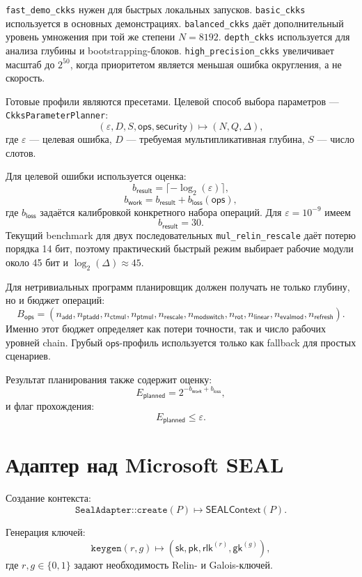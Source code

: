 \documentclass[12pt]{article}
\begin{document}
\texttt{fast\_demo\_ckks} нужен для быстрых локальных запусков.
\texttt{basic\_ckks} используется в основных демонстрациях.
\texttt{balanced\_ckks} даёт дополнительный уровень умножения при
той же степени \(N=8192\). \texttt{depth\_ckks} используется для
анализа глубины и bootstrapping-блоков. \texttt{high\_precision\_ckks}
увеличивает масштаб до \(2^{50}\), когда приоритетом является меньшая
ошибка округления, а не скорость.

Готовые профили являются пресетами. Целевой способ выбора параметров ---
\texttt{CkksParameterPlanner}:
\[
    (\varepsilon, D, S, \mathsf{ops}, \mathsf{security})
    \mapsto
    (N, Q, \Delta),
\]
где \(\varepsilon\) --- целевая ошибка, \(D\) --- требуемая
мультипликативная глубина, \(S\) --- число слотов.

Для целевой ошибки используется оценка:
\[
    b_{\mathsf{result}} = \lceil -\log_2(\varepsilon) \rceil,
\]
\[
    b_{\mathsf{work}}
    =
    b_{\mathsf{result}}
    +
    b_{\mathsf{loss}}(\mathsf{ops}),
\]
где \(b_{\mathsf{loss}}\) задаётся калибровкой конкретного набора
операций. Для \(\varepsilon=10^{-9}\) имеем
\[
    b_{\mathsf{result}} = 30.
\]
Текущий benchmark для двух последовательных
\texttt{mul\_relin\_rescale} даёт потерю порядка 14 бит, поэтому
практический быстрый режим выбирает рабочие модули около 45 бит и
\(\log_2(\Delta)\approx45\).

Для нетривиальных программ планировщик должен получать не только
глубину, но и бюджет операций:
\[
    B_{\mathsf{ops}} =
    (n_{\mathsf{add}}, n_{\mathsf{ptadd}}, n_{\mathsf{ctmul}},
     n_{\mathsf{ptmul}}, n_{\mathsf{rescale}}, n_{\mathsf{modswitch}},
     n_{\mathsf{rot}}, n_{\mathsf{linear}}, n_{\mathsf{evalmod}},
     n_{\mathsf{refresh}}).
\]
Именно этот бюджет определяет как потери точности, так и число рабочих
уровней chain. Грубый \(\mathsf{ops}\)-профиль используется только как
fallback для простых сценариев.

Результат планирования также содержит оценку:
\[
    E_{\mathsf{planned}} = 2^{-b_{\mathsf{work}} + b_{\mathsf{loss}}},
\]
и флаг прохождения:
\[
    E_{\mathsf{planned}} \leq \varepsilon.
\]

\section*{Адаптер над Microsoft SEAL}

Создание контекста:
\[
    \texttt{SealAdapter::create}(P) \mapsto \mathsf{SEALContext}(P).
\]

Генерация ключей:
\[
    \texttt{keygen}(r,g) \mapsto
    (\mathsf{sk}, \mathsf{pk}, \mathsf{rlk}^{(r)}, \mathsf{gk}^{(g)}),
\]
где $r,g \in \{0,1\}$ задают необходимость Relin- и Galois-ключей.
\end{document}

